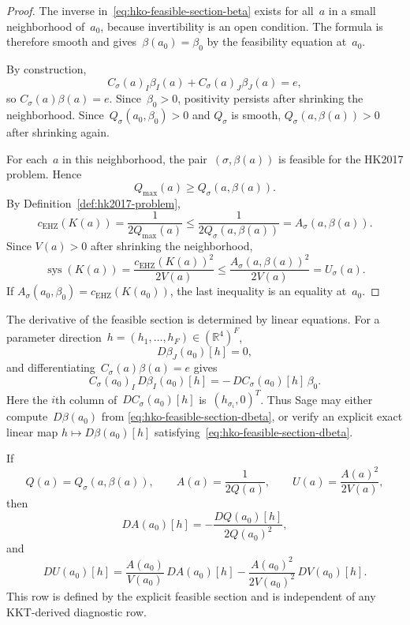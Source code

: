\begin{proof}
The inverse in~\eqref{eq:hko-feasible-section-beta} exists for all~$a$ in a
small neighborhood of~$a_0$, because invertibility is an open condition.
The formula is therefore smooth and gives~$\beta(a_0)=\beta_0$ by the
feasibility equation at~$a_0$.

By construction,
\[
  C_\sigma(a)_I\beta_I(a)+C_\sigma(a)_J\beta_J(a)=e,
\]
so $C_\sigma(a)\beta(a)=e$.  Since~$\beta_0>0$, positivity persists after
shrinking the neighborhood.  Since~$Q_\sigma(a_0,\beta_0)>0$ and
$Q_\sigma$ is smooth, $Q_\sigma(a,\beta(a))>0$ after shrinking again.

For each~$a$ in this neighborhood, the pair~$(\sigma,\beta(a))$ is feasible
for the HK2017 problem.  Hence
\[
  Q_{\max}(a)\geq Q_\sigma(a,\beta(a)).
\]
By Definition~\ref{def:hk2017-problem},
\[
  c_{\mathrm{EHZ}}(K(a))
  =\frac{1}{2Q_{\max}(a)}
  \leq
  \frac{1}{2Q_\sigma(a,\beta(a))}
  =
  A_\sigma(a,\beta(a)).
\]
Since $V(a)>0$ after shrinking the neighborhood,
\[
  \operatorname{sys}(K(a))
  =
  \frac{c_{\mathrm{EHZ}}(K(a))^2}{2V(a)}
  \leq
  \frac{A_\sigma(a,\beta(a))^2}{2V(a)}
  =
  U_\sigma(a).
\]
If $A_\sigma(a_0,\beta_0)=c_{\mathrm{EHZ}}(K(a_0))$, the last inequality is
an equality at~$a_0$.
\end{proof}

\begin{remark}
\label{rem:hko-feasible-section-derivative-data}
The derivative of the feasible section is determined by linear equations.
For a parameter direction~$h=(h_1,\ldots,h_F)\in(\mathbb R^4)^F$,
\[
  D\beta_J(a_0)[h]=0,
\]
and differentiating~$C_\sigma(a)\beta(a)=e$ gives
\begin{equation}
\label{eq:hko-feasible-section-dbeta}
  C_\sigma(a_0)_I\,D\beta_I(a_0)[h]
  =
  -\,DC_\sigma(a_0)[h]\,\beta_0.
\end{equation}
Here the $i$th column of~$DC_\sigma(a_0)[h]$ is~$(h_{\sigma_i},0)^T$.
Thus Sage may either compute~$D\beta(a_0)$ from
\eqref{eq:hko-feasible-section-dbeta}, or verify an explicit exact linear map
$h\mapsto D\beta(a_0)[h]$ satisfying~\eqref{eq:hko-feasible-section-dbeta}.

If
\[
  Q(a)=Q_\sigma(a,\beta(a)),\qquad
  A(a)=\frac{1}{2Q(a)},\qquad
  U(a)=\frac{A(a)^2}{2V(a)},
\]
then
\[
  DA(a_0)[h]=-\frac{DQ(a_0)[h]}{2Q(a_0)^2},
\]
and
\[
  DU(a_0)[h]
  =
  \frac{A(a_0)}{V(a_0)}\,DA(a_0)[h]
  -
  \frac{A(a_0)^2}{2V(a_0)^2}\,DV(a_0)[h].
\]
This row is defined by the explicit feasible section and is independent of any
KKT-derived diagnostic row.
\end{remark}

